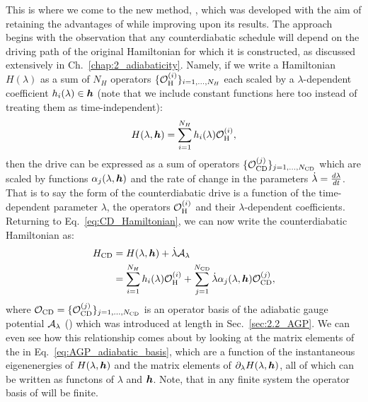 This is where we come to the new method, , which was developed with the aim of retaining the advantages of  while improving upon its results. The approach begins with the observation that any counterdiabatic schedule will depend on the driving path of the original Hamiltonian for which it is constructed, as discussed extensively in Ch.~\ref{chap:2_adiabaticity}. Namely, if we write a Hamiltonian $H(\lambda)$ as a sum of $N_H$ operators $\{ \mathcal{O}_{\rm H}^{(i)} \}_{i = 1,...,N_H}$ each scaled by a $\lambda$-dependent coefficient $h_i(\lambda) \in \boldsymbol{h}$ (note that we include constant functions here too instead of treating them as time-independent):
\begin{equation}
    H(\lambda, \boldsymbol{h}) = \sum_{i = 1}^{N_H} h_i(\lambda) \mathcal{O}_{\rm H}^{(i)},
\end{equation}
then the  drive can be expressed as a sum of operators $\{\mathcal{O}_{\rm CD}^{(j)}\}_{j = 1,...,N_{\rm CD}}$ which are scaled by functions $\alpha_{j}(\lambda, \boldsymbol{h})$ and the rate of change in the parameters $\dot{\lambda} = \frac{d \lambda}{dt}$. That is to say the form of the counterdiabatic drive is a function of the time-dependent parameter $\lambda$, the operators $\mathcal{O}_{\rm H}^{(i)}$ and their $\lambda$-dependent coefficients. Returning to Eq.~\eqref{eq:CD_Hamiltonian}, we can now write the counterdiabatic Hamiltonian as:
\begin{equation}\label{eq:H_cd_operators}
    \begin{aligned}
        H_{\rm CD} &= H(\lambda, \boldsymbol{h}) + \dot{\lambda} \mathcal{A}_{\lambda} \\
        &= \sum_{i = 1}^{N_H} h_i(\lambda) \mathcal{O}_{\rm H}^{(i)} + \sum_{j = 1}^{N_{\rm CD}} \dot{\lambda} \alpha_{j}(\lambda, \boldsymbol{h}) \mathcal{O}_{\rm CD}^{(j)},
    \end{aligned}
\end{equation}
where $\mathcal{O}_{\rm CD} = \{\mathcal{O}_{\rm CD}^{(j)}\}_{j = 1,...,N_{\rm CD}}$ is an operator basis of the adiabatic gauge potential $\mathcal{A}_{\lambda}$ () which was introduced at length in Sec.~\ref{sec:2.2_AGP}. We can even see how this relationship comes about by looking at the matrix elements of the  in Eq.~\eqref{eq:AGP_adiabatic_basis}, which are a function of the instantaneous eigenenergies of $H(\lambda, \boldsymbol{h})$ and the matrix elements of $\partial_{\lambda} H(\lambda, \boldsymbol{h})$, all of which can be written as functons of $\lambda$ and $\boldsymbol{h}$. Note, that in any finite system the operator basis of  will be finite.

